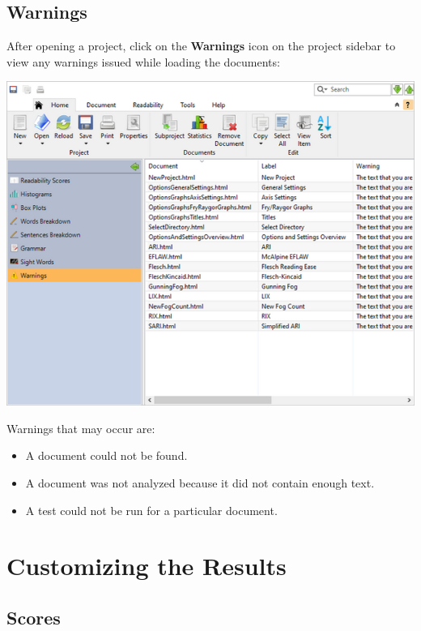 \documentclass[
]{book}
\providecommand{\tightlist}{%
  \setlength{\itemsep}{0pt}\setlength{\parskip}{0pt}}
\theoremstyle{definition}
\theoremstyle{definition}
\theoremstyle{definition}
\theoremstyle{definition}
\theoremstyle{remark}
\begin{document}
\hypertarget{reviewing-batch-warnings}{%
\section{Warnings}\label{reviewing-batch-warnings}}

After opening a project, click on the \textbf{Warnings} icon on the project sidebar to view any warnings issued while loading the documents:

\includegraphics{Images/Warnings.png}

Warnings that may occur are:

\begin{itemize}
\tightlist
\item
  A document could not be found.
\item
  A document was not analyzed because it did not contain enough text.
\item
  A test could not be run for a particular document.
\end{itemize}

\hypertarget{customizing-the-results}{%
\chapter{Customizing the Results}\label{customizing-the-results}}

\hypertarget{scores}{%
\section{Scores}\label{scores}}
\end{document}
